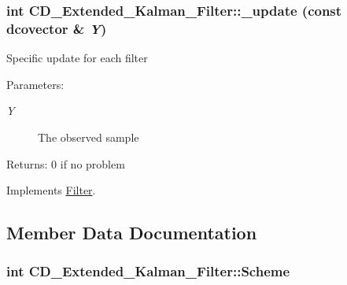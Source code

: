 \hypertarget{class_c_d___extended___kalman___filter_7cfd2bf966970f44f4e1480ed3852b69}{
\subsubsection[{\_\-update}]{\setlength{\rightskip}{0pt plus 5cm}int CD\_\-Extended\_\-Kalman\_\-Filter::\_\-update (const dcovector \& {\em Y})}}
\label{class_c_d___extended___kalman___filter_7cfd2bf966970f44f4e1480ed3852b69}


Specific update for each filter

\begin{Desc}
\item[Parameters:]
\begin{description}
\item[{\em Y}]The observed sample\end{description}
\end{Desc}
\begin{Desc}
\item[Returns:]0 if no problem \end{Desc}


Implements \hyperlink{class_filter_20ecd17fed3b8f11a76c960fe5e7144b}{Filter}.

\subsection{Member Data Documentation}
\hypertarget{class_c_d___extended___kalman___filter_20c7448afdc652603781e4da3385e2b3}{
\subsubsection[{Scheme}]{\setlength{\rightskip}{0pt plus 5cm}int {\bf CD\_\-Extended\_\-Kalman\_\-Filter::Scheme}}}
\label{class_c_d___extended___kalman___filter_20c7448afdc652603781e4da3385e2b3}


